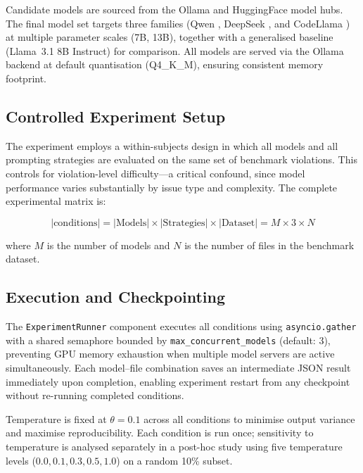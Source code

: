 \noindent
Candidate models are sourced from the Ollama and HuggingFace model hubs.
The final model set targets three families (Qwen \cite{qwen2024}, DeepSeek
\cite{deepseek2024}, and CodeLlama \cite{roziere2023}) at multiple parameter
scales (7B, 13B), together with a generalised baseline (Llama~3.1 8B
Instruct) for comparison.  All models are served via the Ollama backend
at default quantisation (Q4\_K\_M), ensuring consistent memory footprint.

\subsection{Controlled Experiment Setup}

The experiment employs a within-subjects design in which all models and all
prompting strategies are evaluated on the same set of benchmark violations.
This controls for violation-level difficulty—a critical confound, since model
performance varies substantially by issue type and complexity.  The complete
experimental matrix is:

\begin{equation}
  |\text{conditions}| = |\text{Models}| \times |\text{Strategies}| \times
  |\text{Dataset}| = M \times 3 \times N
\end{equation}

\noindent
where $M$ is the number of models and $N$ is the number of files in the
benchmark dataset.

\subsection{Execution and Checkpointing}

The \texttt{ExperimentRunner} component executes all conditions using
\texttt{asyncio.gather} with a shared semaphore bounded by
\texttt{max\_concurrent\_models} (default: 3), preventing GPU memory
exhaustion when multiple model servers are active simultaneously.  Each
model–file combination saves an intermediate JSON result immediately upon
completion, enabling experiment restart from any checkpoint without
re-running completed conditions.

Temperature is fixed at $\theta = 0.1$ across all conditions to minimise
output variance and maximise reproducibility.  Each condition is run once;
sensitivity to temperature is analysed separately in a post-hoc study using
five temperature levels ($0.0, 0.1, 0.3, 0.5, 1.0$) on a random 10\% subset.

